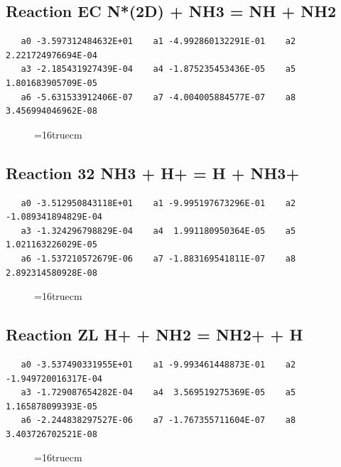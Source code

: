 \documentclass[12pt,dvipdfm]{article}
\begin{document}
\subsection{
Reaction EC N*(2D) + NH3  = NH + NH2}
\begin{small}\begin{verbatim}
   a0 -3.597312484632E+01    a1 -4.992860132291E-01    a2  2.221724976694E-04
   a3 -2.185431927439E-04    a4 -1.875235453436E-05    a5  1.801683905709E-05
   a6 -5.631533912406E-07    a7 -4.004005884577E-07    a8  3.456994046962E-08
   \end{verbatim}\end{small}
\begin{figure}[h!] \label{n2rates}
\epsfxsize=16truecm
\end{figure}
\newpage

\subsection{
Reaction 32 NH3 + H+ = H + NH3+}
\begin{small}\begin{verbatim}
   a0 -3.512950843118E+01    a1 -9.995197673296E-01    a2 -1.089341894829E-04
   a3 -1.324296798829E-04    a4  1.991180950364E-05    a5  1.021163226029E-05
   a6 -1.537210572679E-06    a7 -1.883169541811E-07    a8  2.892314580928E-08
   \end{verbatim}\end{small}
\begin{figure}[h!] \label{n2rates}
\epsfxsize=16truecm
\end{figure}
\newpage

\subsection{
Reaction ZL H+ + NH2 = NH2+ + H}
\begin{small}\begin{verbatim}
   a0 -3.537490331955E+01    a1 -9.993461448873E-01    a2 -1.949720016317E-04
   a3 -1.729087654282E-04    a4  3.569519275369E-05    a5  1.165878099393E-05
   a6 -2.244838297527E-06    a7 -1.767355711604E-07    a8  3.403726702521E-08
   \end{verbatim}\end{small}
\begin{figure}[h!] \label{n2rates}
\epsfxsize=16truecm
\end{figure}
\newpage
\end{document}
